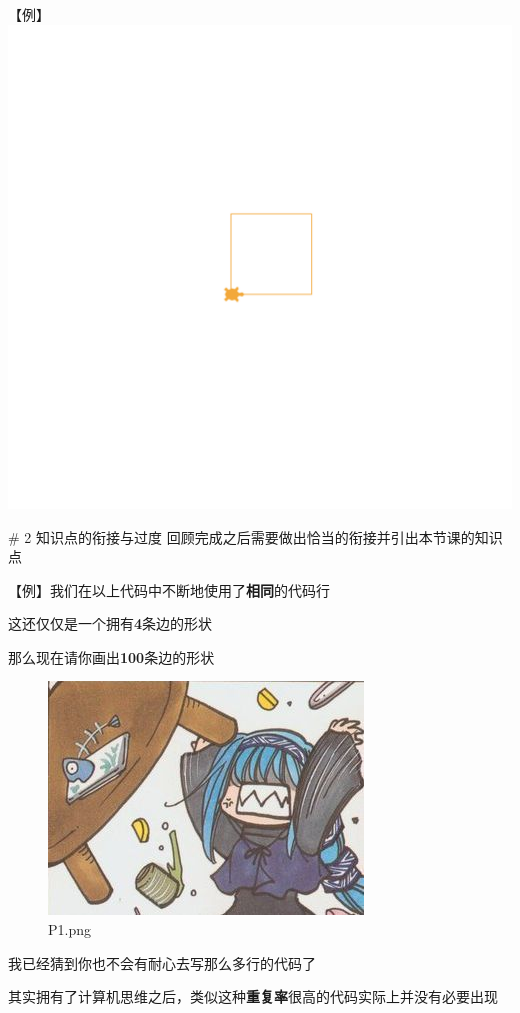 \documentclass[11pt]{article}
\makeatletter
\def\maxwidth{\ifdim\Gin@nat@width>\linewidth\linewidth
    \else\Gin@nat@width\fi}
\let\Oldincludegraphics\includegraphics
\renewcommand{\includegraphics}[1]{\Oldincludegraphics[width=.8\maxwidth]{#1}}
\makeatother
\begin{document}
    【例】 \includegraphics{img/pic1.png}

     \# 2 知识点的衔接与过度
回顾完成之后需要做出恰当的衔接并引出本节课的知识点

【例】我们在以上代码中不断地使用了\textbf{相同}的代码行

这还仅仅是一个拥有\textbf{4}条边的形状

那么现在请你画出\textbf{100}条边的形状

\begin{figure}
\centering
\includegraphics{img/P1.jpeg}
\caption{P1.png}
\end{figure}

我已经猜到你也不会有耐心去写那么多行的代码了

其实拥有了计算机思维之后，类似这种\textbf{重复率}很高的代码实际上并没有必要出现
\end{document}

